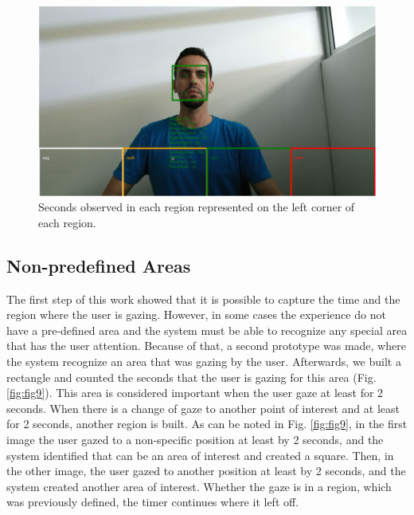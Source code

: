 \documentclass[10pt, conference]{IEEEtran}
\begin{document}
    \begin{figure}[t]
        \centering
        \includegraphics{figures/pic8.png}
        \caption{Seconds observed in each region represented on the left corner of each region.}
        \label{fig:fig8}
    \end{figure}
\subsection{Non-predefined Areas}

The first step of this work showed that it is possible to capture the time and the region where the user is gazing. 
However, in some cases the experience do not have a pre-defined area and the system must be able to recognize any special area that has the user attention. 
Because of that, a second prototype was made, where the system recognize an area that was gazing by the user. 
Afterwards, we built a rectangle and counted the seconds that the user is gazing for this area (Fig. \ref{fig:fig9}). 
This area is considered important when the user gaze at least for 2 seconds. 
When there is a change of gaze to another point of interest and at least for 2 seconds, another region is built. 
As can be noted in Fig. \ref{fig:fig9}, in the first image the user gazed to a non-specific position at least by 2 seconds, and the system identified that can be an area of interest and created a square. 
Then, in the other image, the user gazed to another position at least by 2 seconds, and the system created another area of interest. 
Whether the gaze is in a region, which was previously defined, the timer continues where it left off.
\end{document}
